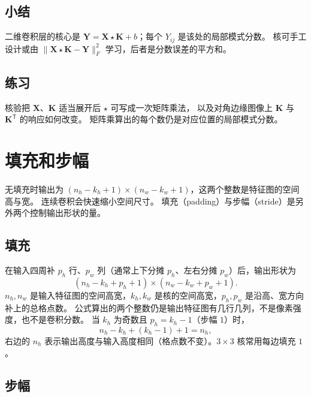 \subsection{小结}

二维卷积层的核心是 $\bm{Y}=\bm{X}\star\bm{K}+b$；每个 $Y_{ij}$ 是该处的局部模式分数。
核可手工设计或由 $\|\bm{X}\star\bm{K}-\bm{Y}\|_{F}^{2}$ 学习，后者是分数误差的平方和。

\subsection{练习}

核验把 $\bm{X}$、$\bm{K}$ 适当展开后 $\star$ 可写成一次矩阵乘法，
以及对角边缘图像上 $\bm{K}$ 与 $\bm{K}^{\mathsf T}$ 的响应如何改变。
矩阵乘算出的每个数仍是对应位置的局部模式分数。

\section{填充和步幅}




无填充时输出为 $(n_h-k_h+1)\times(n_w-k_w+1)$，这两个整数是特征图的空间高与宽。
连续卷积会快速缩小空间尺寸。
填充（padding）与步幅（stride）是另外两个控制输出形状的量。

\subsection{填充}

在输入四周补 $p_h$ 行、$p_w$ 列（通常上下分摊 $p_h$、左右分摊 $p_w$）后，输出形状为
\[
(n_h-k_h+p_h+1)\times(n_w-k_w+p_w+1).
\]
$n_h,n_w$ 是输入特征图的空间高宽，$k_h,k_w$ 是核的空间高宽，$p_h,p_w$ 是沿高、宽方向补上的总格点数。
公式算出的两个整数仍是输出特征图有几行几列，不是像素强度，也不是卷积分数。
当 $k_h$ 为奇数且 $p_h=k_h-1$（步幅 $1$）时，
\[
n_h-k_h+(k_h-1)+1=n_h,
\]
右边的 $n_h$ 表示输出高度与输入高度相同（格点数不变）。$3\times 3$ 核常用每边填充 $1$。

\subsection{步幅}

